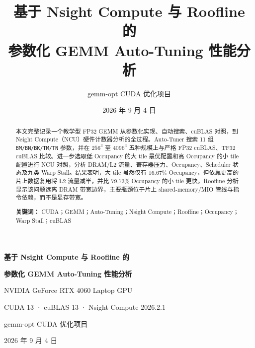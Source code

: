 \documentclass[UTF8,11pt,a4paper,fontset=fandol]{ctexart}
\title{\bfseries 基于 Nsight Compute 与 Roofline 的\\
参数化 GEMM Auto-Tuning 性能分析}
\author{gemm-opt CUDA 优化项目}
\date{2026 年 9 月 4 日}
\newcommand{\code}[1]{\nolinkurl{#1}}
\begin{document}
\begin{titlepage}
  \centering
  \vspace*{2.2cm}
  {\Huge\bfseries 基于 Nsight Compute 与 Roofline 的\par}
  \vspace{0.5cm}
  {\Huge\bfseries 参数化 GEMM Auto-Tuning 性能分析\par}
  \vspace{1.5cm}
  {\Large NVIDIA GeForce RTX 4060 Laptop GPU\par}
  \vspace{0.4cm}
  {\large CUDA 13 · cuBLAS 13 · Nsight Compute 2026.2.1\par}

  \vfill

  \vfill
  {\large gemm-opt CUDA 优化项目\par}
  \vspace{0.3cm}
  {\large 2026 年 9 月 4 日\par}
\end{titlepage}

\begin{abstract}
本文完整记录一个教学型 FP32 GEMM 从参数化实现、自动搜索、cuBLAS 对照，到 Nsight Compute（NCU）硬件计数器分析的全过程。Auto-Tuner 搜索 11 组 \code{BM/BN/BK/TM/TN} 参数，并在 $256^3$ 至 $4096^3$ 五种规模上与严格 FP32 cuBLAS、TF32 cuBLAS 比较。进一步选取低 Occupancy 的大 tile 最优配置和高 Occupancy 的小 tile 配置进行 NCU 对照，分析 DRAM/L2 流量、寄存器压力、Occupancy、Scheduler 状态及九类 Warp Stall。结果表明，大 tile 虽然仅有 16.67\% Occupancy，但依靠更高的片上数据复用将 L2 流量减半，并比 79.73\% Occupancy 的小 tile 更快。Roofline 分析显示该问题远离 DRAM 带宽边界，主要瓶颈位于片上 shared-memory/MIO 管线与指令依赖，而不是显存带宽。

\textbf{关键词：} CUDA；GEMM；Auto-Tuning；Nsight Compute；Roofline；Occupancy；Warp Stall；cuBLAS
\end{abstract}

\tableofcontents
\newpage
\end{document}
